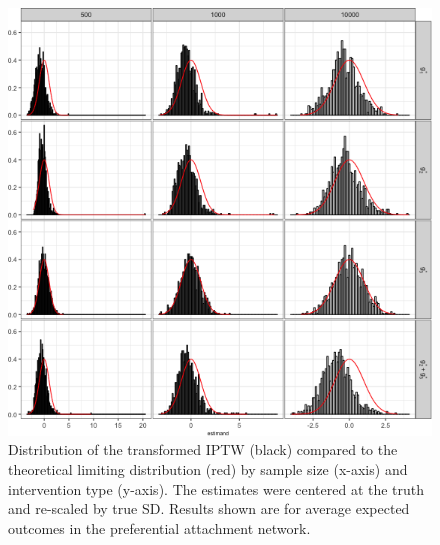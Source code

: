 \documentclass[english]{article}\usepackage[]{graphicx}\usepackage[]{color}
\makeatletter
\def\maxwidth{ %
  \ifdim\Gin@nat@width>\linewidth
    \linewidth
  \else
    \Gin@nat@width
  \fi
}
\newenvironment{knitrout}{}{} %
\theoremstyle{plain}
\theoremstyle{plain}
\makeatother
\begin{document}
\begin{knitrout}\footnotesize
{}\color{fgcolor}\begin{figure}

{\centering \includegraphics[width=\maxwidth]{TablesFigs/knitR-hist_IPTW_EY_prefattach-1} 

}

\caption[Distribution of the transformed IPTW (black) compared to the theoretical limiting distribution (red) by sample size (x-axis) and intervention type (y-axis)]{Distribution of the transformed IPTW (black) compared to the theoretical limiting distribution (red) by sample size (x-axis) and intervention type (y-axis). The estimates were centered at the truth and re-scaled by true SD. Results shown are for average expected outcomes in the preferential attachment network.}\label{fig:hist.IPTW.EY.prefattach}
\end{figure}


\end{knitrout}
\end{document}
